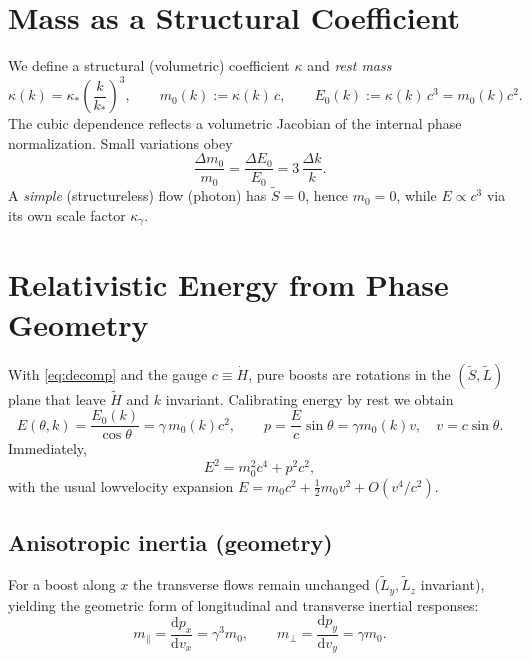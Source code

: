 \documentclass[11pt,a4paper]{article}
\newcommand{\tH}{\tilde{H}}
\newcommand{\tS}{\tilde{S}}
\newcommand{\tL}{\tilde{L}}
\newcommand{\dd}{\mathrm{d}}
\newcommand{\ga}{\gamma}
\begin{document}
\section{Mass as a Structural Coefficient}
We define a structural (volumetric) coefficient $\kappa$ and \emph{rest mass}
\begin{equation}
  \kappa(k) = \kappa_*\!\left(\frac{k}{k_*}\right)^{\!3},
  \qquad m_0(k) := \kappa(k)\,c,
  \qquad E_0(k) := \kappa(k)\,c^3 = m_0(k)c^2.
  \label{eq:struct}
\end{equation}
The cubic dependence reflects a volumetric Jacobian of the internal phase normalization. Small variations obey
\begin{equation}
  \frac{\Delta m_0}{m_0}=\frac{\Delta E_0}{E_0}=3\,\frac{\Delta k}{k}.
  \label{eq:small}
\end{equation}
A \emph{simple} (structureless) flow (photon) has $\tS=0$, hence $m_0=0$, while $E\propto c^3$ via its own scale factor $\kappa_\gamma$.

\section{Relativistic Energy from Phase Geometry}
With \cref{eq:decomp} and the gauge $c\equiv\dot H$, pure boosts are rotations in the $(\tS,\tL)$ plane that leave $\tH$ and $k$ invariant. Calibrating energy by rest we obtain
\begin{equation}
  E(\theta,k)=\frac{E_0(k)}{\cos\theta}=\ga\,m_0(k)c^2,\qquad p=\frac{E}{c}\sin\theta=\ga m_0(k) v,\quad v=c\sin\theta.
  \label{eq:energy}
\end{equation}
Immediately,
\begin{equation}
  E^2 = m_0^2 c^4 + p^2 c^2,
  \label{eq:emrelation}
\end{equation}
with the usual low\textendash velocity expansion $E=m_0c^2+\tfrac12 m_0 v^2+O(v^4/c^2)$.

\subsection*{Anisotropic inertia (geometry)}
For a boost along $x$ the transverse flows remain unchanged ($\tL_y,\tL_z$ invariant), yielding the geometric form of longitudinal and transverse inertial responses:
\begin{equation}
  m_{\parallel}=\frac{\dd p_x}{\dd v_x}=\ga^3 m_0,\qquad m_{\perp}=\frac{\dd p_y}{\dd v_y}=\ga m_0.
  \label{eq:anis}
\end{equation}
\end{document}
